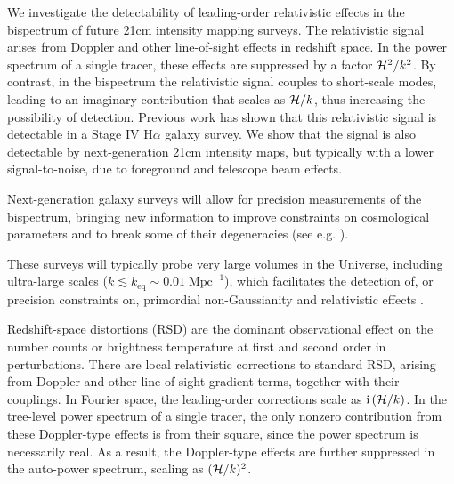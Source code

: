 We investigate the detectability of leading-order relativistic effects in the bispectrum of future 21cm intensity  mapping surveys. The relativistic signal arises from Doppler and other line-of-sight effects in redshift space. In the power spectrum of a single tracer, these effects are suppressed by a factor $\mathcal{H}^2/k^2$. By contrast, in the bispectrum the relativistic signal couples to short-scale modes, leading to
an imaginary contribution that scales as $\mathcal{H}/k$, thus increasing the possibility of detection.
Previous work has shown that this relativistic signal is detectable in a Stage IV H$\alpha$ galaxy survey. 
{We show that the signal is also detectable by next-generation  21cm intensity maps, but typically with a lower signal-to-noise, due to foreground and telescope beam effects.}


{Next-generation galaxy surveys will allow for precision measurements of the  bispectrum, bringing new information to improve constraints on cosmological parameters and to break some of their degeneracies (see e.g. \cite{Scoccimarro:2015bla,Tellarini:2016sgp, Gil-Marin:2016wya,  Slepian:2016kfz,Gagrani:2016rfy, Sugiyama:2018yzo,Desjacques:2018pfv,Child:2018klv, Yankelevich:2018uaz, Schmit:2018rtf,DiDio:2018unb,Gualdi:2019ybt,Sarkar:2019ojl,Chudaykin:2019ock,Oddo:2019run, Sugiyama:2019ike,Philcox:2019hdi,Durrer:2020orn,Montanari:2020uez}). 

These surveys will typically probe very large volumes in the Universe, including ultra-large scales ($k\lesssim k_{\mathrm{eq}} \sim 0.01\;\mathrm{Mpc}^{-1}$), which facilitates the detection of, or precision constraints on, primordial non-Gaussianity \cite{Tellarini:2015faa,Watkinson:2017zbs,Majumdar:2017tdm,Karagiannis:2018jdt,Karagiannis:2019jjx,Bharadwaj:2020wkc}
and relativistic effects
\cite{Kehagias:2015tda,Umeh:2016nuh, DiDio:2016gpd, Jolicoeur:2017nyt,Bertacca:2017dzm,Jolicoeur:2017eyi,Koyama:2018ttg,Clarkson:2018dwn,Maartens:2019yhx,Jeong:2019igb}.
 
Redshift-space distortions (RSD) are the dominant observational effect on the number counts or brightness temperature at first and second order in perturbations. There are local relativistic corrections to standard RSD, arising from Doppler and other line-of-sight gradient terms, together with their couplings.  In Fourier space, the leading-order corrections  scale as $\mathrm{i\,}(\mathcal{H}/k)$. In the tree-level power spectrum of a single tracer, the only nonzero contribution from these Doppler-type effects is from their square, since the power spectrum is necessarily real. As a result, the Doppler-type effects are further suppressed in the auto-power spectrum, scaling as  $(\mathcal{H}/k)^2$. 

}
